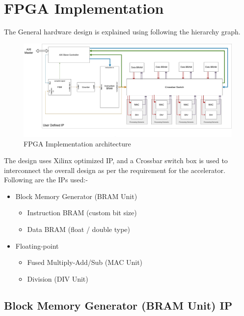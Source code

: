 \chapter{FPGA Implementation}
The General hardware design is explained using following the hierarchy graph.

\begin{figure}[H]
    \centering
    \includegraphics[width = \textwidth]{./FPGA_Implementation/OWN_Hardware.jpg}
    \caption{FPGA Implementation architecture}
    \label{fig:sym:flowGraph}
\end{figure}


The design uses Xilinx optimized IP, and a Crossbar switch box is used to interconnect the overall design as per the requirement for the accelerator. Following are the IPs used:-
\begin{itemize}
	\item Block Memory Generator (BRAM Unit) \cite{Xilinx_BRAM}
		\begin{itemize}
		\item Instruction BRAM (custom bit size)
		\item Data BRAM (float / double type)
		\end{itemize}
	\item Floating-point \cite{Xilinx_Floatpt}
		\begin{itemize}
			\item Fused Multiply-Add/Sub (MAC Unit)
			\item Division (DIV Unit)
		\end{itemize}
\end{itemize}

\section{Block Memory Generator (BRAM Unit) IP}

